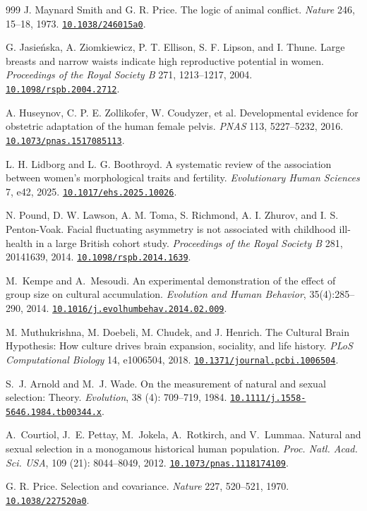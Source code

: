 \documentclass[10pt,twocolumn,letterpaper]{article}
\newcommand{\doi}[1]{\href{https://doi.org/#1}{\nolinkurl{#1}}}
\begin{document}
\begin{thebibliography}{999}
 J. Maynard Smith and G. R. Price. The logic of animal conflict. \emph{Nature} 246, 15--18, 1973. \doi{10.1038/246015a0}.

 G. Jasie\'nska, A. Ziomkiewicz, P. T. Ellison, S. F. Lipson, and I. Thune. Large breasts and narrow waists indicate high reproductive potential in women. \emph{Proceedings of the Royal Society B} 271, 1213--1217, 2004. \doi{10.1098/rspb.2004.2712}.

 A. Huseynov, C. P. E. Zollikofer, W. Coudyzer, et al. Developmental evidence for obstetric adaptation of the human female pelvis. \emph{PNAS} 113, 5227--5232, 2016. \doi{10.1073/pnas.1517085113}.

 L. H. Lidborg and L. G. Boothroyd. A systematic review of the association between women's morphological traits and fertility. \emph{Evolutionary Human Sciences} 7, e42, 2025. \doi{10.1017/ehs.2025.10026}.

 N. Pound, D. W. Lawson, A. M. Toma, S. Richmond, A. I. Zhurov, and I. S. Penton-Voak. Facial fluctuating asymmetry is not associated with childhood ill-health in a large British cohort study. \emph{Proceedings of the Royal Society B} 281, 20141639, 2014. \doi{10.1098/rspb.2014.1639}.

 M.~Kempe and A.~Mesoudi. An experimental demonstration of the effect of group size on cultural accumulation. \emph{Evolution and Human Behavior}, 35(4):285--290, 2014. \doi{10.1016/j.evolhumbehav.2014.02.009}.

 M. Muthukrishna, M. Doebeli, M. Chudek, and J. Henrich. The Cultural Brain Hypothesis: How culture drives brain expansion, sociality, and life history. \emph{PLoS Computational Biology} 14, e1006504, 2018. \doi{10.1371/journal.pcbi.1006504}.

 S.~J. {Arnold} and M.~J. {Wade}. {On the measurement of natural and sexual selection: Theory}. \emph{Evolution}, 38 (4): 709--719, 1984. \doi{10.1111/j.1558-5646.1984.tb00344.x}.

 A.~{Courtiol}, J.~E. {Pettay}, M.~{Jokela}, A.~{Rotkirch}, and V.~{Lummaa}. {Natural and sexual selection in a monogamous historical human population}. \emph{Proc. Natl. Acad. Sci. USA}, 109 (21): 8044--8049, 2012. \doi{10.1073/pnas.1118174109}.

 G. R. Price. Selection and covariance. \emph{Nature} 227, 520--521, 1970. \doi{10.1038/227520a0}.


\end{thebibliography}
\end{document}
